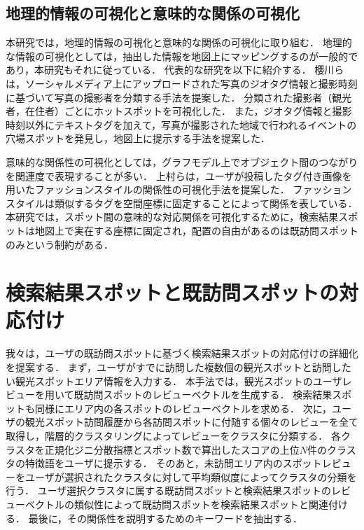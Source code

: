 \documentclass{deimj}
\begin{document}
\subsection{地理的情報の可視化と意味的な関係の可視化}
本研究では，地理的情報の可視化と意味的な関係の可視化に取り組む．
地理的な情報の可視化としては，抽出した情報を地図上にマッピングするのが一般的であり，本研究もそれに従っている．
代表的な研究を以下に紹介する．
櫻川ら\cite{櫻川2015}は，ソーシャルメディア上にアップロードされた写真のジオタグ情報と撮影時刻に基づいて写真の撮影者を分類する手法を提案した．
分類された撮影者（観光者，在住者）ごとにホットスポットを可視化した．
また，ジオタグ情報と撮影時刻以外にテキストタグを加えて，写真が撮影された地域で行われるイベントの穴場スポットを発見し，地図上に提示する手法を提案した\cite{櫻川2016}．

意味的な関係性の可視化としては，グラフモデル上でオブジェクト間のつながりを関連度で表現することが多い．
上村ら\cite{上村}は，ユーザが投稿したタグ付き画像を用いたファッションスタイルの関係性の可視化手法を提案した．
ファッションスタイルは類似するタグを空間座標に固定することによって関係を表している．
本研究では，スポット間の意味的な対応関係を可視化するために，検索結果スポットは地図上で実在する座標に固定され，配置の自由があるのは既訪問スポットのみという制約がある．

\section{検索結果スポットと既訪問スポットの対応付け}
\label{sec:検索結果スポットと既訪問スポットの対応付け}
我々は，ユーザの既訪問スポットに基づく検索結果スポットの対応付けの詳細化を提案する．
まず，ユーザがすでに訪問した複数個の観光スポットと訪問したい観光スポットエリア情報を入力する．
本手法では，観光スポットのユーザレビューを用いて既訪問スポットのレビューベクトルを生成する．
検索結果スポットも同様にエリア内の各スポットのレビューベクトルを求める．
次に，ユーザの観光スポット訪問履歴から各訪問スポットに付随する個々のレビューを全て取得し，階層的クラスタリングによってレビューをクラスタに分類する．
各クラスタを正規化ジニ分散指標とスポット数で算出したスコアの上位$N$件のクラスタの特徴語をユーザに提示する．
そのあと，未訪問エリア内のスポットレビューをユーザが選択されたクラスタに対して平均類似度によってクラスタの分類を行う．
ユーザ選択クラスタに属する既訪問スポットと検索結果スポットのレビューベクトルの類似性によって既訪問スポットを検索結果スポットと関連付ける．
最後に，その関係性を説明するためのキーワードを抽出する．
\end{document}
